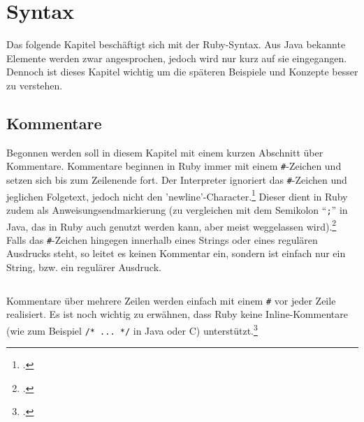 \documentclass[a4paper, 11pt]{scrreprt}
\begin{document}
\chapter{Syntax}
Das folgende Kapitel beschäftigt sich mit der Ruby-Syntax. Aus Java bekannte Elemente werden zwar angesprochen, jedoch wird nur kurz auf sie eingegangen. Dennoch ist dieses Kapitel wichtig um die späteren Beispiele und Konzepte besser zu verstehen.
 
\section{Kommentare}
Begonnen werden soll in diesem Kapitel mit einem kurzen Abschnitt über Kommentare. Kommentare beginnen in Ruby immer mit einem \texttt{\#}-Zeichen und setzen sich bis zum Zeilenende fort. 
Der Interpreter ignoriert das \texttt{\#}-Zeichen und jeglichen Folgetext, jedoch nicht den 'newline'-Character.\footcite[vgl.][S.26]{ruby_lang} Dieser dient in Ruby zudem als Anweisungsendmarkierung (zu vergleichen mit dem Semikolon ``\texttt{;}'' in Java, das in Ruby auch genutzt werden kann, aber meist weggelassen wird).\footcite[vgl.][S.32]{ruby_lang} Falls das \texttt{\#}-Zeichen hingegen innerhalb eines Strings oder eines regulären Ausdrucks steht, so leitet es keinen Kommentar ein, sondern ist einfach nur ein String, bzw. ein regulärer Ausdruck.
\inputminted[]{ruby}{comments.rb}
Kommentare über mehrere Zeilen werden einfach mit einem \texttt{\#} vor jeder Zeile realisiert. Es ist noch wichtig zu erwähnen, dass Ruby keine Inline-Kommentare (wie zum Beispiel \texttt{/* ... */} in Java oder C) unterstützt.\footcite[vgl.][S.26]{ruby_lang}
\end{document}
